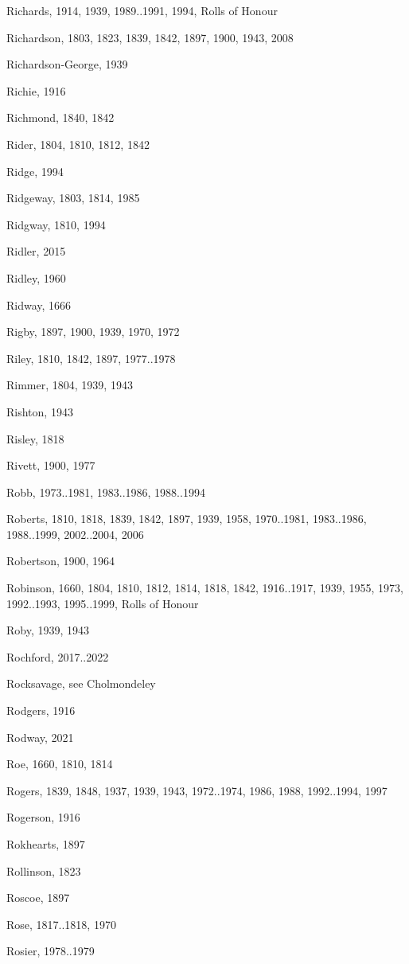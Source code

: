 {\begin{theindex}
\item Richards, 1914, 1939, 1989..1991, 1994, Rolls of Honour
\item Richardson, 1803, 1823, 1839, 1842, 1897, 1900, 1943, 2008
\item Richardson-George, 1939
\item Richie, 1916
\item Richmond, 1840, 1842
\item Rider, 1804, 1810, 1812, 1842
\item Ridge, 1994
\item Ridgeway, 1803, 1814, 1985
\item Ridgway, 1810, 1994
\item Ridler, 2015
\item Ridley, 1960
\item Ridway, 1666
\item Rigby, 1897, 1900, 1939, 1970, 1972
\item Riley, 1810, 1842, 1897, 1977..1978
\item Rimmer, 1804, 1939, 1943
\item Rishton, 1943
\item Risley, 1818
\item Rivett, 1900, 1977
\item Robb, 1973..1981, 1983..1986, 1988..1994
\item Roberts, 1810, 1818, 1839, 1842, 1897, 1939, 1958, 1970..1981, 1983..1986, 1988..1999, 2002..2004, 2006
\item Robertson, 1900, 1964
\item Robinson, 1660, 1804, 1810, 1812, 1814, 1818, 1842, 1916..1917, 1939, 1955, 1973, 1992..1993, 1995..1999, Rolls of Honour
\item Roby, 1939, 1943
\item Rochford, 2017..2022
\item Rocksavage, see Cholmondeley
\item Rodgers, 1916
\item Rodway, 2021
\item Roe, 1660, 1810, 1814
\item Rogers, 1839, 1848, 1937, 1939, 1943, 1972..1974, 1986, 1988, 1992..1994, 1997
\item Rogerson, 1916
\item Rokhearts, 1897
\item Rollinson, 1823
\item Roscoe, 1897
\item Rose, 1817..1818, 1970
\item Rosier, 1978..1979

\end{theindex}}

